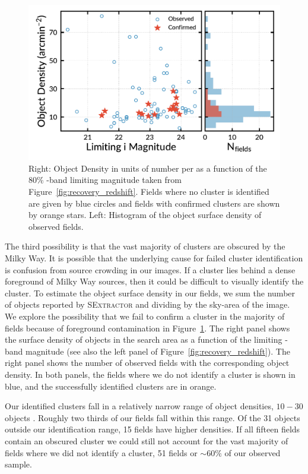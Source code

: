 \documentclass[apj, revtex4-1]{emulateapj}
\begin{document}
\begin{figure}
	\includegraphics[width=\columnwidth]{figures/N_vs_density.pdf}
	\caption{Right: Object Density in units of number per \arcminsq as a function of the 80\% \sdssi-band limiting magnitude taken from Figure~\ref{fig:recovery_redshift}. Fields where no cluster is identified are given by blue circles and fields with confirmed clusters are shown by orange stars. Left: Histogram of the object surface density of observed fields.}
	\label{fig:N_vs_density}
\end{figure}

The third possibility is that the vast majority of clusters are obscured by the Milky Way. It is possible that the underlying cause for failed cluster identification is confusion from source crowding in our images. If a cluster lies behind a dense foreground of Milky Way sources, then it could be difficult to visually identify the cluster. To estimate the object surface density in our fields, we sum the number of objects reported by \textsc{SExtractor} and dividing by the sky-area of the image. We explore the possibility that we fail to confirm a cluster in the majority of fields because of foreground contamination in Figure~\ref{fig:N_vs_density}. The right panel shows the surface density of objects in the search area as a function of the limiting \sdssi-band magnitude (see also the left panel of Figure~\ref{fig:recovery_redshift}). The right panel shows the number of observed fields with the corresponding object density. In both panels, the fields where we do not identify a cluster is shown in blue, and the successfully identified clusters are in orange.

Our identified clusters fall in a relatively narrow range of object densities, $10-30$ objects \perarcminsq. Roughly two thirds of our fields fall within this range. Of the 31 objects outside our identification range, 15 fields have higher densities. If all fifteen fields contain an obscured cluster we could still not account for the vast majority of fields where we did not identify a cluster, 51 fields or $\sim60\%$ of our observed sample.
\end{document}
